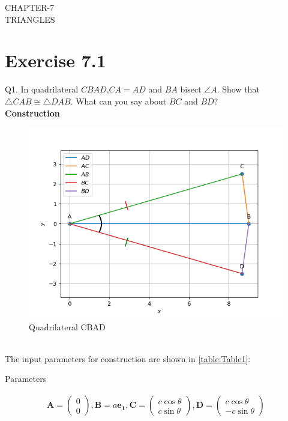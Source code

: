 \documentclass{article}
\newcommand{\myvec}[1]{\ensuremath{\begin{pmatrix}#1\end{pmatrix}}}
\let\vec\mathbf
\begin{document}
\begin{center}
        \textbf\large{CHAPTER-7 \\ TRIANGLES}
\end{center}
\section{Exercise 7.1}
Q1. In quadrilateral $CBAD$,$CA = AD$ and $BA$ bisect $\angle{A}$. Show that $\triangle{CAB} \cong \triangle{DAB}$. What can you say about $BC$ and $BD$? \\
\textbf{Construction}\\
\begin{figure}[h]
	\begin{center}
		\includegraphics[width=\columnwidth]{figs/graph.png}
	\end{center}
	\caption{Quadrilateral CBAD}
	\label{fig:Fig1}
\end{figure}
\pagebreak
\\ The input parameters for construction are shown in \ref{table:Table1}:\\
\begin{table}[h]
	  \centering
	  
	  \caption{Parameters}
	  \label{tab:Table1}
\end{table}
\begin{align}
	\vec{A} = \myvec{0\\0},\vec{B} = a\vec{e_1},\vec{C} = \myvec{c\cos\theta\\c\sin\theta},\vec{D} = \myvec{c\cos\theta\\-c\sin\theta}
\end{align}
\end{document}
